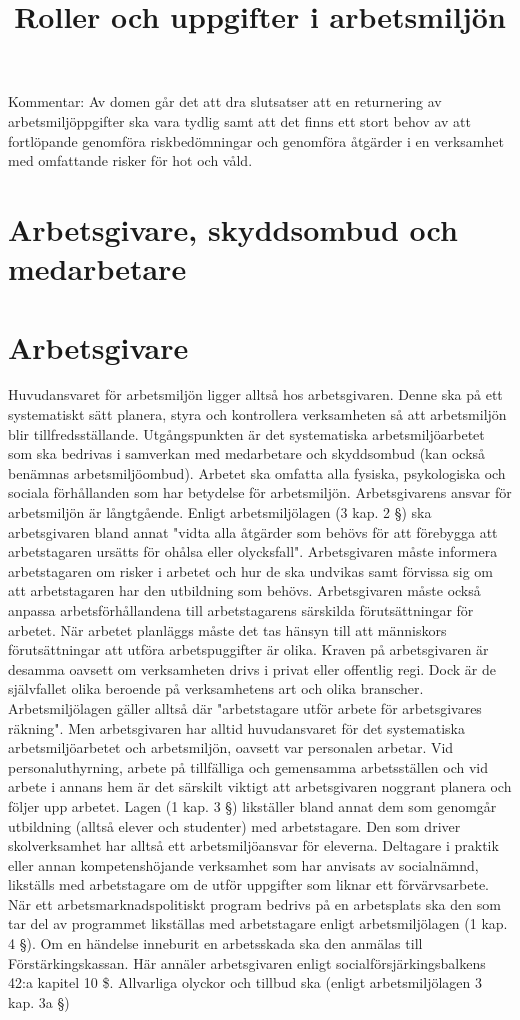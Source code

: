 Kommentar: Av domen går det att dra slutsatser att en returnering av arbetsmiljöppgifter ska vara tydlig samt att det finns ett stort behov av att fortlöpande genomföra riskbedömningar och genomföra åtgärder i en verksamhet med omfattande risker för hot och våld.

\title{
Roller och uppgifter i arbetsmiljön
}
\section*{Arbetsgivare, skyddsombud och medarbetare}
\section*{Arbetsgivare}
Huvudansvaret för arbetsmiljön ligger alltså hos arbetsgivaren. Denne ska på ett systematiskt sätt planera, styra och kontrollera verksamheten så att arbetsmiljön blir tillfredsställande. Utgångspunkten är det systematiska arbetsmiljöarbetet som ska bedrivas i samverkan med medarbetare och skyddsombud (kan också benämnas arbetsmiljöombud). Arbetet ska omfatta alla fysiska, psykologiska och sociala förhållanden som har betydelse för arbetsmiljön.
Arbetsgivarens ansvar för arbetsmiljön är långtgående. Enligt arbetsmiljölagen (3 kap. 2 §) ska arbetsgivaren bland annat "vidta alla åtgärder som behövs för att förebygga att arbetstagaren ursätts för ohålsa eller olycksfall". Arbetsgivaren måste informera arbetstagaren om risker i arbetet och hur de ska undvikas samt förvissa sig om att arbetstagaren har den utbildning som behövs. Arbetsgivaren måste också anpassa arbetsförhållandena till arbetstagarens särskilda förutsättningar för arbetet. När arbetet planläggs måste det tas hänsyn till att människors förutsättningar att utföra arbetspuggifter är olika.
Kraven på arbetsgivaren är desamma oavsett om verksamheten drivs i privat eller offentlig regi. Dock är de självfallet olika beroende på verksamhetens art och olika branscher.
Arbetsmiljölagen gäller alltså där "arbetstagare utför arbete för arbetsgivares räkning". Men arbetsgivaren har alltid huvudansvaret för det systematiska arbetsmiljöarbetet och arbetsmiljön, oavsett var personalen arbetar.
Vid personaluthyrning, arbete på tillfälliga och gemensamma arbetsställen och vid arbete i annans hem är det särskilt viktigt att arbetsgivaren noggrant planera och följer upp arbetet. Lagen (1 kap. 3 §) likställer bland annat dem som genomgår utbildning (alltså elever och studenter) med arbetstagare. Den som driver skolverksamhet har alltså ett arbetsmiljöansvar för eleverna. Deltagare i praktik eller annan kompetenshöjande verksamhet som har anvisats av socialnämnd, likställs med arbetstagare om de utför uppgifter som liknar ett förvärvsarbete. När ett arbetsmarknadspolitiskt program bedrivs på en arbetsplats ska den som tar del av programmet likställas med arbetstagare enligt arbetsmiljölagen (1 kap. 4 §).
Om en händelse inneburit en arbetsskada ska den anmälas till Förstärkingskassan. Här annäler arbetsgivaren enligt socialförsjärkingsbalkens 42:a kapitel 10 \$. Allvarliga olyckor och tillbud ska (enligt arbetsmiljölagen 3 kap. 3a §)

